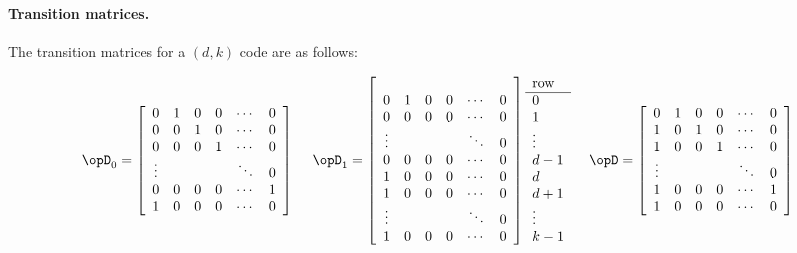 \paragraph{Transition matrices.}
The transition matrices for a $(d,k)$ code are as follows:
\begin{fsK}
\[
   \opD_0 = 
      \left[
         \begin{array}{*{8}{c}}
            0      & 1 & 0 & 0 & \cdots & 0  \\
            0      & 0 & 1 & 0 & \cdots & 0  \\
            0      & 0 & 0 & 1 & \cdots & 0  \\
            \vdots &   &   &   & \ddots & 0  \\
            0      & 0 & 0 & 0 & \cdots & 1  \\
            1      & 0 & 0 & 0 & \cdots & 0  
         \end{array}
      \right]
\hspace{3ex}
   \opD_1 = 
      \left[
         \begin{array}{*{6}{c}}
                   &   &   &   &        &    \\
            0      & 1 & 0 & 0 & \cdots & 0  \\
            0      & 0 & 0 & 0 & \cdots & 0  \\
            \vdots &   &   &   & \ddots & 0  \\
            0      & 0 & 0 & 0 & \cdots & 0  \\
            1      & 0 & 0 & 0 & \cdots & 0  \\
            1      & 0 & 0 & 0 & \cdots & 0  \\
            \vdots &   &   &   & \ddots & 0  \\
            1      & 0 & 0 & 0 & \cdots & 0 
         \end{array}
      \right]
         \begin{array}{l}
            \mbox{row} \\
            \hline
            0          \\
            1          \\
            \vdots     \\
            d-1        \\
            d          \\
            d+1        \\
            \vdots     \\
            k-1
         \end{array}
\hspace{3ex}
   \opD   = 
      \left[
         \begin{array}{*{8}{c}}
            0      & 1 & 0 & 0 & \cdots & 0  \\
            1      & 0 & 1 & 0 & \cdots & 0  \\
            1      & 0 & 0 & 1 & \cdots & 0  \\
            \vdots &   &   &   & \ddots & 0  \\
            1      & 0 & 0 & 0 & \cdots & 1  \\
            1      & 0 & 0 & 0 & \cdots & 0  
         \end{array}
      \right]
\]
\end{fsK}
